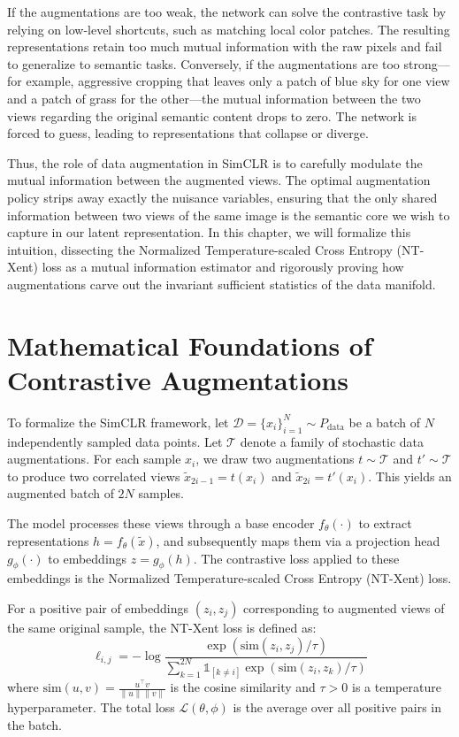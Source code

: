 If the augmentations are too weak, the network can solve the contrastive task by relying on low-level shortcuts, such as matching local color patches. The resulting representations retain too much mutual information with the raw pixels and fail to generalize to semantic tasks. Conversely, if the augmentations are too strong---for example, aggressive cropping that leaves only a patch of blue sky for one view and a patch of grass for the other---the mutual information between the two views regarding the original semantic content drops to zero. The network is forced to guess, leading to representations that collapse or diverge.

Thus, the role of data augmentation in SimCLR is to carefully modulate the mutual information between the augmented views. The optimal augmentation policy strips away exactly the nuisance variables, ensuring that the only shared information between two views of the same image is the semantic core we wish to capture in our latent representation. In this chapter, we will formalize this intuition, dissecting the Normalized Temperature-scaled Cross Entropy (NT-Xent) loss as a mutual information estimator and rigorously proving how augmentations carve out the invariant sufficient statistics of the data manifold.

\section{Mathematical Foundations of Contrastive Augmentations}

To formalize the SimCLR framework, let $\mathcal{D} = \{x_i\}_{i=1}^N \sim P_{\text{data}}$ be a batch of $N$ independently sampled data points. Let $\mathcal{T}$ denote a family of stochastic data augmentations. For each sample $x_i$, we draw two augmentations $t \sim \mathcal{T}$ and $t' \sim \mathcal{T}$ to produce two correlated views $\tilde{x}_{2i-1} = t(x_i)$ and $\tilde{x}_{2i} = t'(x_i)$. This yields an augmented batch of $2N$ samples.

The model processes these views through a base encoder $f_\theta(\cdot)$ to extract representations $h = f_\theta(\tilde{x})$, and subsequently maps them via a projection head $g_\phi(\cdot)$ to embeddings $z = g_\phi(h)$. The contrastive loss applied to these embeddings is the Normalized Temperature-scaled Cross Entropy (NT-Xent) loss.

\begin{definition}
For a positive pair of embeddings $(z_i, z_j)$ corresponding to augmented views of the same original sample, the NT-Xent loss is defined as:
\begin{equation}
    \ell_{i,j} = - \log \frac{\exp(\text{sim}(z_i, z_j)/\tau)}{\sum_{k=1}^{2N} \mathbb{1}_{[k \neq i]} \exp(\text{sim}(z_i, z_k)/\tau)}
\end{equation}
where $\text{sim}(u, v) = \frac{u^\top v}{\|u\| \|v\|}$ is the cosine similarity and $\tau > 0$ is a temperature hyperparameter. The total loss $\mathcal{L}(\theta, \phi)$ is the average over all positive pairs in the batch.
\end{definition}

